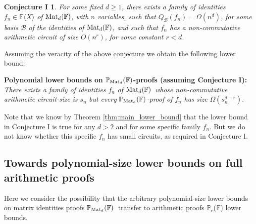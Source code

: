 \documentclass[12pt,reqno]{article}
\newcommand\F{\ensuremath{\mathbb F}}
\newcommand\PP{{\mathbb P}}
\newcommand\PC{\ensuremath{\PP_c}}
\newcommand\PMd{\ensuremath{\PP_{{\rm Mat}_d}(\F)}}
\newcommand{\cd}{\cdot}
\newcommand {\ind} {\noindent}
\newcommand{\matd}{{\ensuremath{{\rm Mat}_d(\F)}}}
\newcommand{\freea}{\ensuremath{\F\langle X\rangle}}
\newcommand{\iddofix}[2][]
{\todo[inline, size=\footnotesize, caption={#2}, #1, linecolor=green!70!white,         backgroundcolor=red!30!white,bordercolor=white]
{{#2}}}
\begin{document}
\bigskip

\newtheorem*{C1}{Conjecture I}
\begin{boxedminipage}[c]{1.\textwidth}
\vspace{5pt}
\begin{C1}
For some fixed $d\ge 1$, there exists a family of identities  $f_n\in\freea$ of \matd, with $n$ variables, such that $Q_{\mathcal B}(f_n)=\Omega(n^d)$, for some basis $\mathcal B $ of the identities of \matd,
\textit{and} such that
$f_n$ has a non-commutative arithmetic circuit of size  $O(n^r)$, for some constant $r<d$.
\end{C1}\vspace{0pt}
\end{boxedminipage}
\bigskip

Assuming the veracity of the above conjecture we obtain the following lower bound:\medskip

\ind
\textbf{Polynomial lower bounds on \PMd-proofs (assuming Conjecture I):} \textit{There exists a family of identities $f_n$ of \matd\ whose non-commutative arithmetic circuit-size is $s_n$ but every \PMd-proof of $f_n$ has size  $\Omega(s_n^{d-r})$.}
\bigskip

Note that we know by Theorem \ref{thm:main_lower_bound} that the lower bound in Conjecture I is true for any $d>2$ and for some specific family  $f_n$. But we do not know whether this specific $f_n$ has small circuits, as required in Conjecture I. %

\bigskip

\subsection{Towards polynomial-size  lower bounds on full arithmetic  proofs}

Here we consider the possibility that the  arbitrary polynomial-size lower bounds on matrix identities proofs \PMd\ transfer  to arithmetic proofs \PC(\F) lower bounds.


\end{document}
